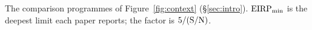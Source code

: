 
\begin{table}
\centering
\caption{The comparison programmes of Figure~\ref{fig:context}
(\S\ref{sec:intro}). $\mathrm{EIRP}_{\rm min}$ is the deepest limit each
paper reports; the factor is $\LtCommonSnr/(\mathrm{S/N})$.}
\label{tab:litthresh}
\scriptsize
\setlength{\tabcolsep}{4pt}

\end{table}

